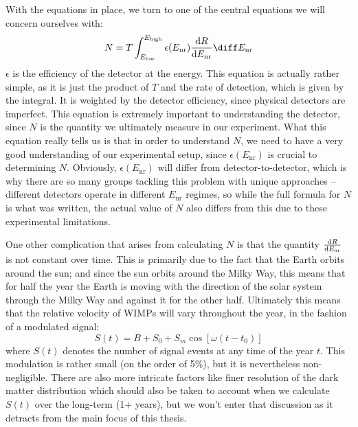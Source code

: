 With the equations in place, we turn to one of the central equations we will concern ourselves with: 
\[
	N = T \int_{E_\text{low}}^{E_\text{high}} \epsilon(E_\text{nr}) \dv{R}{E_\text{nr}} \diff E_\text{nr}
\]
\( \epsilon \) is the efficiency of the detector at the energy. This equation is actually rather simple, as
it is just the product of \( T \) and the rate of detection, which is given by the integral. It is weighted
by the detector efficiency, since physical detectors are imperfect. This equation is extremely important to
understanding the detector, since \( N \) is the quantity we ultimately measure in our experiment. What this
equation really tells us is that in order to understand \( N \), we need to have a very good understanding of
our experimental setup, since \( \epsilon(E_\text{nr}) \) is crucial to determining \( N \). Obviously, \(
\epsilon(E_\text{nr}) \) will differ from detector-to-detector, which is why there are so many groups tackling
this problem with unique approaches -- different detectors operate in different \( E_\text{nr} \) regimes,
so while the full formula for \( N \) is what was written, the actual value of \( N \) also differs from this
due to these experimental limitations. 

One other complication that arises from calculating \( N \) is that the quantity \( \dv{R}{E_\text{nr}} \) is
not constant over time. This is primarily due to the fact that the Earth orbits around the sun; and since the
sun orbits around the Milky Way, this means that for half the year the Earth is moving with the direction of
the solar system through the Milky Way and against it for the other half. Ultimately this means that the
relative velocity of WIMPs will vary throughout the year, in the fashion of a modulated signal:
\begin{equation}
	\label{signal}
	S(t) = B + S_0 + S_m \cos\left[ \omega(t - t_0) \right]
\end{equation}
where \( S(t) \) denotes the number of signal events at any time of the year \( t \). This modulation is
rather small (on the order of 5\%), but it is nevertheless non-negligible. There are also more intricate
factors like finer resolution of the dark matter distribution which should also be taken to account when we
calculate \( S(t) \) over the long-term (1+ years), but we won't enter that discussion as it detracts from
the main focus of this thesis.  


